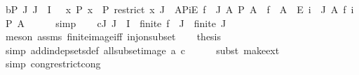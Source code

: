 \begin{isabellebody}
\ b{\isacharcolon}{\kern0pt}{\isachardoublequoteopen}{\isasymAnd}P\ J{\isachardot}{\kern0pt}\ J\ {\isasymsubseteq}\ I\ {\isasymLongrightarrow}\ \ {\isacharparenleft}{\kern0pt}{\isasymAnd}x{\isachardot}{\kern0pt}\ P\ x\ {\isacharequal}{\kern0pt}\ P\ {\isacharparenleft}{\kern0pt}restrict\ x\ J{\isacharparenright}{\kern0pt}{\isacharparenright}{\kern0pt}\ {\isasymLongrightarrow}\ {\isacharparenleft}{\kern0pt}{\isasymforall}A{\isacharprime}{\kern0pt}{\isasymin}PiE\ {\isacharparenleft}{\kern0pt}f\ {\isacharbackquote}{\kern0pt}\ J{\isacharparenright}{\kern0pt}\ A{\isachardot}{\kern0pt}\ P\ {\isacharparenleft}{\kern0pt}A{\isacharprime}{\kern0pt}\ {\isasymcirc}\ f{\isacharparenright}{\kern0pt}{\isacharparenright}{\kern0pt}\ {\isacharequal}{\kern0pt}\ {\isacharparenleft}{\kern0pt}{\isasymforall}A{\isacharprime}{\kern0pt}\ {\isasymin}\ {\isasymPi}\isactrlsub E\ i\ {\isasymin}\ J{\isachardot}{\kern0pt}\ A\ {\isacharparenleft}{\kern0pt}f\ i{\isacharparenright}{\kern0pt}{\isachardot}{\kern0pt}\ P\ A{\isacharprime}{\kern0pt}{\isacharparenright}{\kern0pt}{\isachardoublequoteclose}\isanewline
\ \ \ \ \isamarkupfalse%
\ {\isacharparenleft}{\kern0pt}simp{\isacharparenright}{\kern0pt}\isanewline
\isanewline
\ \ \isamarkupfalse%
\ c{\isacharcolon}{\kern0pt}{\isachardoublequoteopen}{\isasymAnd}J{\isachardot}{\kern0pt}\ J\ {\isasymsubseteq}\ I\ {\isasymLongrightarrow}\ finite\ {\isacharparenleft}{\kern0pt}f\ {\isacharbackquote}{\kern0pt}\ J{\isacharparenright}{\kern0pt}\ {\isacharequal}{\kern0pt}\ finite\ J{\isachardoublequoteclose}\ \isanewline
\ \ \ \ \isamarkupfalse%
\ {\isacharparenleft}{\kern0pt}meson\ assms\ finite{\isacharunderscore}{\kern0pt}image{\isacharunderscore}{\kern0pt}iff\ inj{\isacharunderscore}{\kern0pt}on{\isacharunderscore}{\kern0pt}subset{\isacharparenright}{\kern0pt}\isanewline
\isanewline
\ \ \isamarkupfalse%
\ {\isacharquery}{\kern0pt}thesis\isanewline
\ \ \ \ \isamarkupfalse%
\ {\isacharparenleft}{\kern0pt}simp\ add{\isacharcolon}{\kern0pt}indep{\isacharunderscore}{\kern0pt}sets{\isacharunderscore}{\kern0pt}def\ all{\isacharunderscore}{\kern0pt}subset{\isacharunderscore}{\kern0pt}image\ a\ c{\isacharparenright}{\kern0pt}\isanewline
\ \ \ \ \isamarkupfalse%
\ {\isacharparenleft}{\kern0pt}subst\ make{\isacharunderscore}{\kern0pt}ext{\isacharparenright}{\kern0pt}\ \isamarkupfalse%
\ {\isacharparenleft}{\kern0pt}simp\ cong{\isacharcolon}{\kern0pt}restrict{\isacharunderscore}{\kern0pt}cong{\isacharparenright}{\kern0pt}\isanewline
\ \ \ \ \isamarkupfalse%

\end{isabellebody}

